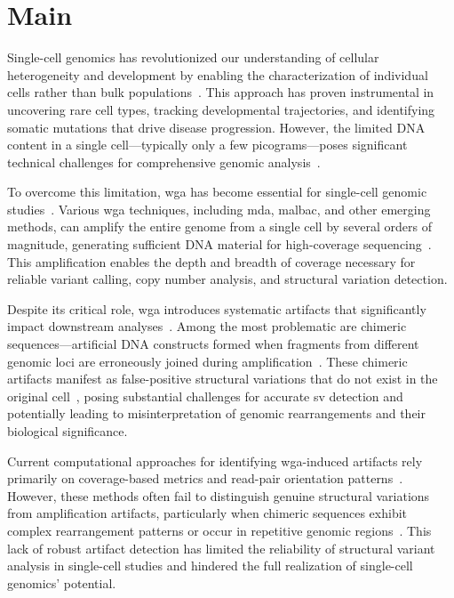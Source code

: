 \documentclass[pdflatex,sn-nature]{sn-jnl}%
\theoremstyle{thmstyleone}%
\theoremstyle{thmstyletwo}%
\theoremstyle{thmstylethree}%
\begin{document}
\maketitle

\section*{Main}\label{sec:main}

Single-cell genomics has revolutionized our understanding of cellular heterogeneity and development by enabling the characterization of individual cells rather than bulk populations~\cite{kalef2024single, sun2024mapping}.
This approach has proven instrumental in uncovering rare cell types, tracking developmental trajectories, and identifying somatic mutations that drive disease progression.
However, the limited DNA content in a single cell—typically only a few picograms—poses significant technical challenges for comprehensive genomic analysis~\cite{leung2016highly, gawad2016single}.

To overcome this limitation, \gls{wga} has become essential for single-cell genomic studies~\cite{zong2012genome, huang2015single}.
Various \gls{wga} techniques, including \gls{mda}, \gls{malbac}, and other emerging methods, can amplify the entire genome from a single cell by several orders of magnitude, generating sufficient DNA material for high-coverage sequencing~\cite{de2014quantitative, biezuner2021comparison,fu2015uniform, agyabeng2025evaluating}.
This amplification enables the depth and breadth of coverage necessary for reliable variant calling, copy number analysis, and structural variation detection.

Despite its critical role, \gls{wga} introduces systematic artifacts that significantly impact downstream analyses~\cite{lu2023chimera, lu2023exploration}.
Among the most problematic are chimeric sequences—artificial DNA constructs formed when fragments from different genomic loci are erroneously joined during amplification~\cite{lu2023chimera, lu2023exploration, agyabeng2025evaluating}.
These chimeric artifacts manifest as false-positive structural variations that do not exist in the original cell~\cite{lu2023chimera}, posing substantial challenges for accurate \gls{sv} detection and potentially leading to misinterpretation of genomic rearrangements and their biological significance.

Current computational approaches for identifying \gls{wga}-induced artifacts rely primarily on coverage-based metrics and read-pair orientation patterns~\cite{kiguchi2021long, lu2023exploration}.
However, these methods often fail to distinguish genuine structural variations from amplification artifacts, particularly when chimeric sequences exhibit complex rearrangement patterns or occur in repetitive genomic regions~\cite{kosugi2019comprehensive, mahmoud2019structural}.
This lack of robust artifact detection has limited the reliability of structural variant analysis in single-cell studies and hindered the full realization of single-cell genomics' potential.
\end{document}
